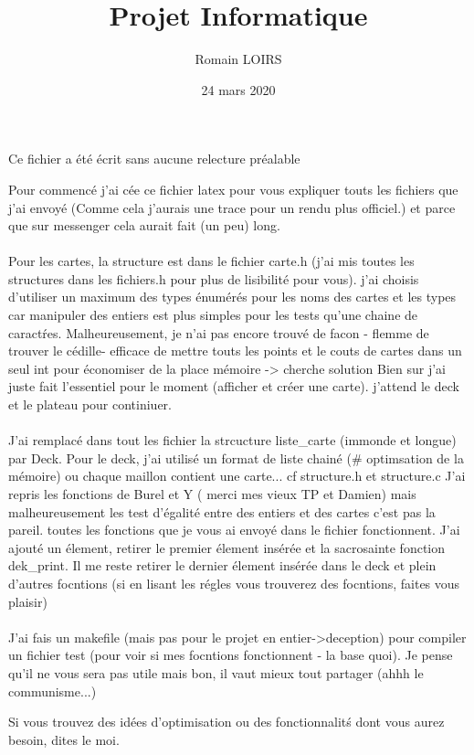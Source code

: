 \documentclass{article}
\title{Projet Informatique}
\author{Romain LOIRS}
\date{24 mars 2020}
\begin{document}
\maketitle
\tableofcontents 

\newpage

Ce fichier a \'et\'e \'ecrit sans aucune relecture pr\'ealable

Pour commenc\'e j'ai c\'ee ce fichier latex pour vous expliquer touts les fichiers que j'ai envoy\'e (Comme cela j'aurais une trace pour un rendu plus officiel.) et parce que sur messenger cela aurait fait (un peu) long.

\paragraph{}
Pour les cartes, la structure est dans le fichier carte.h (j'ai mis toutes les structures dans les fichiers.h pour plus de lisibilit\'e pour vous). j'ai choisis d'utiliser un maximum des types \'enum\'er\'es pour les noms des cartes et les types car manipuler des entiers est plus simples pour les tests qu'une chaine de caract\'res.  Malheureusement, je n'ai pas encore trouv\'e de facon - flemme de trouver le c\'edille- efficace de mettre touts les points et le couts de cartes dans un seul int pour \'economiser de la place m\'emoire -> cherche solution
Bien sur j'ai juste fait l'essentiel pour le moment (afficher et cr\'eer une carte). j'attend le deck et le plateau pour continiuer.

\paragraph{}
J'ai remplacé dans tout les fichier la strcucture liste_carte (immonde et longue) par Deck. Pour le deck, j'ai utilis\'e un format de liste chain\'e (\# optimsation de la m\'emoire) ou chaque maillon contient une carte... cf structure.h et structure.c
J'ai repris les fonctions de Burel  et Y ( merci mes vieux TP et Damien) mais malheureusement les test d'\'egalit\'e entre des entiers et des cartes c'est pas la pareil. toutes les fonctions que je vous ai envoy\'e dans   le fichier fonctionnent. J'ai ajout\'e un \'element, retirer le premier \'element ins\'er\'ee et la sacrosainte fonction dek\_print. Il me reste retirer le dernier \'element ins\'er\'ee dans le deck et plein d'autres focntions (si en lisant les r\'egles vous trouverez des focntions, faites vous plaisir)

\paragraph{}

J'ai fais un makefile (mais pas pour le projet en entier->deception) pour compiler un fichier test (pour voir si mes focntions fonctionnent - la base quoi). Je pense qu'il ne vous sera pas utile mais bon, il vaut mieux tout partager (ahhh le communisme...)

Si vous trouvez des id\'ees d'optimisation ou des fonctionnalit\'s dont vous aurez besoin, dites le moi.
\end{document}
